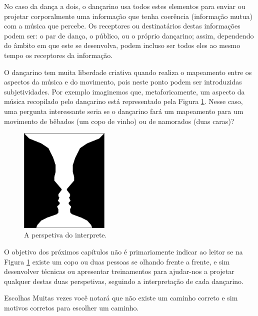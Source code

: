 No caso da dança a dois, o dançarino usa todos estes elementos 
para enviar ou projetar corporalmente uma informação que tenha coerência (informação mutua) com a música que percebe.
Os receptores ou destinatários destas informações podem ser: o par de dança,
o público, ou o próprio dançarino; 
assim, dependendo do âmbito em que este se desenvolva,
podem incluso ser todos eles ao mesmo tempo os receptores da informação.

O dançarino tem muita liberdade criativa quando realiza o 
mapeamento entre os aspectos da música e do movimento, 
pois neste ponto podem ser introduzidas subjetividades. 
Por exemplo imaginemos que, metaforicamente, um aspecto da música recopilado pelo dançarino 
está representado pela Figura \ref{fig:LaCopaDeRubin}.
Nesse caso, uma pergunta interessante seria se 
o dançarino fará um mapeamento para um movimento de bêbados (um copo de vinho) ou de namorados (duas caras)?
\begin{figure}[!h]
  \centering
    \includegraphics[width=0.38\textwidth]{chapters/cap-musicalidade/LaCopaDeRubin.eps}
\caption{A perspetiva do interprete.}
\label{fig:LaCopaDeRubin}
\end{figure}

O objetivo dos próximos  capítulos não é primariamente indicar ao leitor se na Figura \ref{fig:LaCopaDeRubin} 
existe um copo ou duas pessoas se olhando frente a frente, e sim desenvolver técnicas ou 
apresentar treinamentos para ajudar-nos a projetar qualquer destas duas perspetivas, 
seguindo a interpretação de cada dançarino.

\begin{FraseFernandoPR}{Escolhas}
Muitas vezes você notará que não existe um caminho correto 
e sim motivos corretos para escolher um caminho.%
\end{FraseFernandoPR}

